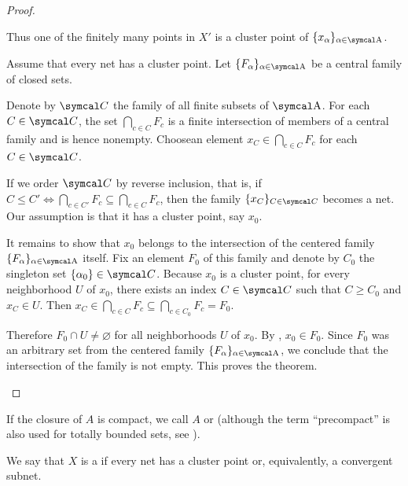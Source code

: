 \begin{proof}
\begin{description}
    Thus one of the finitely many points in \( X' \) is a cluster point of \( \{ x_\al \}_{\al \in \CA} \).

    \cite[theorem 3.1.23]{Engelking1989} Assume that every net has a cluster point. Let \( \{ F_\al \}_{\al \in \CA} \) be a central family of closed sets.

    Denote by \( \Cal C \) the family of all finite subsets of \( \CA \). For each \( C \in \Cal C \), the set \( \bigcap_{c \in C} F_c \) is a finite intersection of members of a central family and is hence nonempty. Choose\AOC an element \( x_C \in \bigcap_{c \in C} F_c \) for each \( C \in \Cal C \).

    If we order \( \Cal C \) by reverse inclusion, that is, if \( C \leq C' \iff \bigcap_{c \in C'} F_c \subseteq \bigcap_{c \in C} F_c \), then the family \( \{ x_C \}_{C \in \Cal C} \) becomes a net. Our assumption is that it has a cluster point, say \( x_0 \).

    It remains to show that \( x_0 \) belongs to the intersection of the centered family \( \{ F_\al \}_{\al \in \CA} \) itself. Fix an element \( F_0 \) of this family and denote by \( C_0 \) the singleton set \( \{ \al_0 \} \in \Cal C \). Because \( x_0 \) is a cluster point, for every neighborhood \( U \) of \( x_0 \), there exists an index \( C \in \Cal C \) such that \( C \geq C_0 \) and \( x_C \in U \). Then \( x_C \in \bigcap_{c \in C} F_c \subseteq \bigcap_{c \in C_0} F_c = F_0 \).

    Therefore \( F_0 \cap U \neq \varnothing \) for all neighborhoods \( U \) of \( x_0 \). By , \( x_0 \in F_0 \). Since \( F_0 \) was an arbitrary set from the centered family \( \{ F_\al \}_{\al \in \CA} \), we conclude that the intersection of the family is not empty. This proves the theorem.
  \end{description}
\end{proof}

\begin{remark}\label{remark:precompact_set}
  If the closure of \( A \) is compact, we call \( A \)  or  (although the term \enquote{precompact} is also used for totally bounded sets, see ).
\end{remark}

\begin{definition}\label{def:sequentially_compact_space}
  We say that \( X \) is a  if every net has a cluster point or, equivalently, a convergent subnet.
\end{definition}

